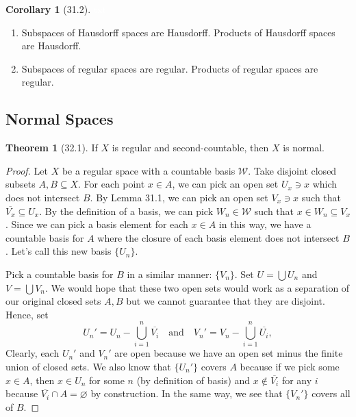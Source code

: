 \documentclass{article}
\newcommand{\nline}{\vspace*{0.5\baselineskip}}
\theoremstyle{definition}
\newtheorem{theorem}{Theorem}[subsection]
\newtheorem{corollary}{Corollary}[subsection]
\begin{document}
\begin{flushleft}
\begin{corollary}[31.2]
\textcolor{white}{txt}
\begin{enumerate}
    \item Subspaces of Hausdorff spaces are Hausdorff. Products of Hausdorff spaces are Hausdorff.
    \item Subspaces of regular spaces are regular. Products of regular spaces are regular.
\end{enumerate}
\end{corollary}

\subsection{Normal Spaces}

\begin{theorem}[32.1]
If $X$ is regular and second-countable, then $X$ is normal.
\end{theorem}

\begin{proof}
Let $X$ be a regular space with a countable basis $\mathcal{W}$. Take disjoint closed subsets $A, B \subseteq X$. For each point $x \in A$, we can pick an open set $U_x \ni x$ which does not intersect $B$. By Lemma 31.1, we can pick an open set $V_x \ni x$ such that $\overline{V_x} \subseteq U_x$. By the definition of a basis, we can pick $W_n \in \mathcal{W}$ such that $x \in W_n \subseteq V_x$. Since we can pick a basis element for each $x \in A$ in this way, we have a countable basis for $A$ where the closure of each basis element does not intersect $B$. Let's call this new basis $\{U_n\}$.

\nline

Pick a countable basis for $B$ in a similar manner: $\{V_n\}$. Set $U = \bigcup U_n$ and $V = \bigcup V_n$. We would hope that these two open sets would work as a separation of our original closed sets $A, B$ but we cannot guarantee that they are disjoint. Hence, set
\[
U_n' = U_n - \bigcup_{i=1}^n \overline{V_i} \quad \text{and} \quad V_n' = V_n - \bigcup_{i=1}^n \overline{U_i},
\]
Clearly, each $U_n'$ and $V_n'$ are open because we have an open set minus the finite union of closed sets. We also know that $\{U_n'\}$ covers $A$ because if we pick some $x \in A$, then $x \in U_n$ for some $n$ (by definition of basis) and $x \notin \overline{V_i}$ for any $i$ because $\overline{V_i} \cap A = \varnothing$ by construction. In the same way, we see that $\{V_n'\}$ covers all of $B$.

\nline


\end{proof}
\end{flushleft}
\end{document}

